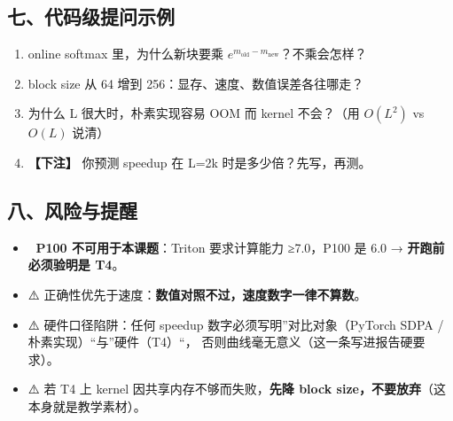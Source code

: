 \documentclass[
  chinese,
  11pt,
]{ctexart}
\providecommand{\tightlist}{%
  \setlength{\itemsep}{0pt}\setlength{\parskip}{0pt}}
\begin{document}
\subsection{七、代码级提问示例}\label{ux4e03ux4ee3ux7801ux7ea7ux63d0ux95eeux793aux4f8b}

\begin{enumerate}
\def\labelenumi{\arabic{enumi}.}
\tightlist
\item
  online softmax 里，为什么新块要乘 \(e^{m_{\text{old}}-m_{\text{new}}}\)？不乘会怎样？
\item
  block size 从 64 增到 256：显存、速度、数值误差各往哪走？
\item
  为什么 L 很大时，朴素实现容易 OOM 而 kernel 不会？（用 \(O(L^2)\) vs \(O(L)\) 说清）
\item
  \textbf{【下注】} 你预测 speedup 在 L=2k 时是多少倍？先写，再测。
\end{enumerate}

\subsection{八、风险与提醒}\label{ux516bux98ceux9669ux4e0eux63d0ux9192}

\begin{itemize}
\tightlist
\item
  🚨 \textbf{P100 不可用于本课题}：Triton 要求计算能力 ≥7.0，P100 是 6.0 → \textbf{开跑前必须验明是 T4}。
\item
  ⚠️ 正确性优先于速度：\textbf{数值对照不过，速度数字一律不算数}。
\item
  ⚠️ 硬件口径陷阱：任何 speedup 数字必须写明''对比对象（PyTorch SDPA / 朴素实现）``与''硬件（T4）``， 否则曲线毫无意义（这一条写进报告硬要求）。
\item
  ⚠️ 若 T4 上 kernel 因共享内存不够而失败，\textbf{先降 block size，不要放弃}（这本身就是教学素材）。
\end{itemize}
\end{document}
